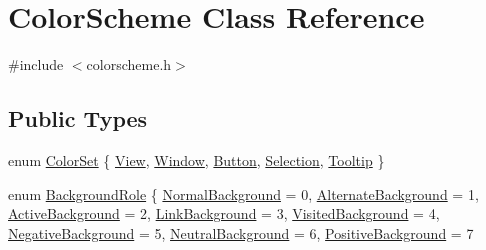 \hypertarget{class_color_scheme}{}\section{Color\+Scheme Class Reference}
\label{class_color_scheme}


{\ttfamily \#include $<$colorscheme.\+h$>$}

\subsection*{Public Types}
\begin{DoxyCompactItemize}
\item 
enum \hyperlink{class_color_scheme_a56ea451e86dffa1822ed087902844e05}{Color\+Set} \{ \newline
\hyperlink{class_color_scheme_a56ea451e86dffa1822ed087902844e05a45150fc89ebfd98918cb57ecae48f7c8}{View}, 
\hyperlink{class_color_scheme_a56ea451e86dffa1822ed087902844e05a17906dbad876f3a9cb4fb61c7d0623e1}{Window}, 
\hyperlink{class_color_scheme_a56ea451e86dffa1822ed087902844e05a2ec3005e68be8fbf30a1ed17c7faf611}{Button}, 
\hyperlink{class_color_scheme_a56ea451e86dffa1822ed087902844e05ad6e57137a0e7b024a5336b51230fdd00}{Selection}, 
\newline
\hyperlink{class_color_scheme_a56ea451e86dffa1822ed087902844e05a54266f367ee9fee32be3be727b114da8}{Tooltip}
 \}
\item 
enum \hyperlink{class_color_scheme_a70715e73df1fb0f140797633f8043a8c}{Background\+Role} \{ \newline
\hyperlink{class_color_scheme_a70715e73df1fb0f140797633f8043a8ca9762dd3095372ba69df3c550d96af844}{Normal\+Background} = 0, 
\hyperlink{class_color_scheme_a70715e73df1fb0f140797633f8043a8ca6190946d2bfcb48ed41595850bba869c}{Alternate\+Background} = 1, 
\hyperlink{class_color_scheme_a70715e73df1fb0f140797633f8043a8cac6dea12fb5d23ecf82142af1adb39ec3}{Active\+Background} = 2, 
\hyperlink{class_color_scheme_a70715e73df1fb0f140797633f8043a8ca4c54e4821465af55b8266e7ee7f39adb}{Link\+Background} = 3, 
\newline
\hyperlink{class_color_scheme_a70715e73df1fb0f140797633f8043a8ca70649caf4df2051cdae72fa39250bb8d}{Visited\+Background} = 4, 
\hyperlink{class_color_scheme_a70715e73df1fb0f140797633f8043a8ca55a397343d2fc1ea8527ff401f109e63}{Negative\+Background} = 5, 
\hyperlink{class_color_scheme_a70715e73df1fb0f140797633f8043a8cabec9eb67f3b13e5e8cbe2d8e9e2efee9}{Neutral\+Background} = 6, 
\hyperlink{class_color_scheme_a70715e73df1fb0f140797633f8043a8ca3925f3061468258acbca115ca6384f3f}{Positive\+Background} = 7

\end{DoxyCompactItemize}
